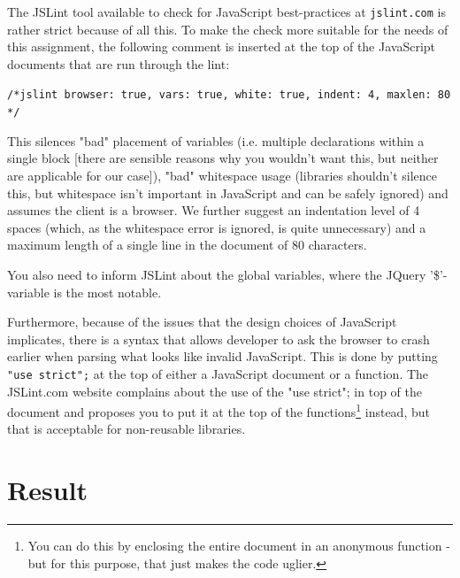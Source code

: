 \documentclass[a4paper]{scrartcl}
\begin{document}
The JSLint tool available to check for JavaScript best-practices at \texttt{jslint.com} is rather strict because of all this. To make the check more suitable for the needs of this assignment, the following comment is inserted at the top of the JavaScript documents that are run through the lint:

\texttt{/*jslint browser: true, vars: true, white: true, indent: 4, maxlen: 80 */}

This silences "bad" placement of variables (i.e. multiple declarations within a single block [there are sensible reasons why you wouldn't want this, but neither are applicable for our case]), "bad" whitespace usage (libraries shouldn't silence this, but whitespace isn't important in JavaScript and can be safely ignored) and assumes the client is a browser. We further suggest an indentation level of 4 spaces (which, as the whitespace error is ignored, is quite unnecessary) and a maximum length of a single line in the document of 80 characters.

You also need to inform JSLint about the global variables, where the JQuery '\$'-variable is the most notable.

Furthermore, because of the issues that the design choices of JavaScript implicates, there is a syntax that allows developer to ask the browser to crash earlier when parsing what looks like invalid JavaScript. This is done by putting \texttt{"use strict";} at the top of either a JavaScript document or a function. The JSLint.com website complains about the use of the "use strict"; in top of the document and proposes you to put it at the top of the functions\footnote{You can do this by enclosing the entire document in an anonymous function - but for this purpose, that just makes the code uglier.} instead, but that is acceptable for non-reusable libraries.

\section{Result}
\label{sec:results}
\end{document}
